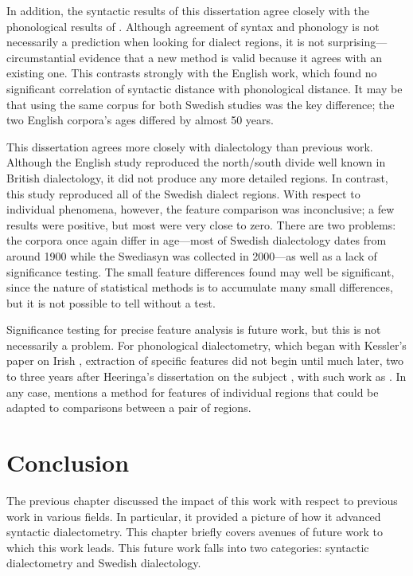 In addition, the syntactic results of this dissertation agree closely
with the phonological results of . Although
agreement of syntax and phonology is not necessarily a prediction when
looking for dialect regions, it is not surprising---circumstantial
evidence that a new method is valid because it agrees with an existing
one. This contrasts strongly with the English work, which found no
significant correlation of syntactic distance with phonological
distance. It may be that using the same corpus for both Swedish
studies was the key difference; the two English corpora's ages differed by
almost 50 years.

This dissertation agrees more closely with dialectology than previous
work. Although the English study reproduced the north/south divide
well known in British dialectology, it did not produce any more
detailed regions. In contrast, this study reproduced all of the
Swedish dialect regions. With respect to individual phenomena,
however, the feature comparison was inconclusive; a few results were
positive, but most were very close to zero. There are two problems: the
corpora once again differ in age---most of Swedish dialectology dates
from around 1900 while the Swediasyn was collected in 2000---as well as a
lack of significance testing. The small feature differences found
may well be significant, since the nature of statistical
methods is to accumulate many small differences, but it is not
possible to tell without a test.

Significance testing for precise feature analysis is future work, but
this is not necessarily a problem. For phonological dialectometry,
which began with Kessler's paper on Irish \cite{kessler95}, extraction
of specific features did not begin until much later, two to three
years after Heeringa's dissertation on the subject \cite{heeringa04},
with such work as .
In any case,  mentions a method for features of
individual regions that could be adapted to comparisons between a pair
of regions.

\chapter{Conclusion}
\label{conclusion-chapter}

The previous chapter discussed the impact of this work with respect to
previous work in various fields. In particular, it provided a picture
of how it advanced syntactic dialectometry. This chapter briefly
covers avenues of future work to which this work leads. This future work falls
into two categories: syntactic dialectometry and Swedish
dialectology.

